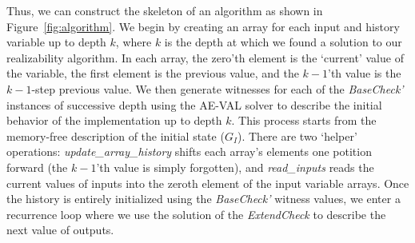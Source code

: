 \noindent

Thus, we can construct the skeleton of an algorithm as shown in Figure~\ref{fig:algorithm}.  
We begin by creating an array for each input and history variable up to depth
$k$, where $k$ is the depth at which we found a solution to our realizability algorithm.
In each array, the zero'th element is the `current' value of the variable, the first element is the previous value, and the $k-1$'th value is the $k-1$-step previous value.
We then generate witnesses for each of the {\em BaseCheck'} instances of
successive depth using the AE-VAL solver to describe the initial behavior of the
implementation up to depth $k$.  This process starts from the memory-free
description of the initial state ($G_I$).  There are two `helper' operations:
{\em update\_array\_history} shifts each array's elements one potition forward
(the $k-1$'th value is simply forgotten), and {\em read\_inputs} reads the current values of inputs into the zeroth element of the input variable arrays.  Once the history is entirely initialized using the {\em BaseCheck'} witness values, we enter a recurrence loop where we use the solution of the {\em ExtendCheck} to describe the next value of outputs.
 
\iffalse
Taking this query and providing it as a target formula for AE-VAL effectively
gives an answer to the synthesis problem in the form of a Skolem relation for
the candidate states that can further extend valid execution paths in the
system. In other words, the Skolem relation contains, starting from a valid
initial state of variables, strategies in terms of how the new state is
selected, in such a way, that the contract is not violated. This is particularly
interesting in our case since in the underlying machinery, each contract is
translated into an equivalent program in the Lustre specification language,
which explicitly defines expressions that dictate the way in which each variable
is expected to behave after a transition occurs to a new state. Therefore, a
final implementation is a simple Lustre program that--apart from the initial
state definitions--contains a set of expressions that depict the behaviour of
each variable under a certain condition, in an equivalent manner to that
indicated by the Skolem relation.
\fi

